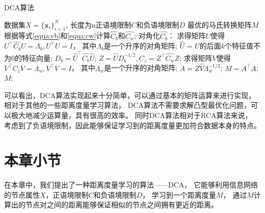 \begin{algorithm}[htb]
    \caption{DCA算法}
    \label{algo:dca}
    \begin{algorithmic}[1]
        \Require
        数据集$X = \{ \bm{x}_i \}_{i=1}^{N}$,
        长度为n正语境限制$C$和负语境限制$D$        
        \Ensure
        最优的马氏转换矩阵$M$
        \State 根据等式\ref{equa:cb}和\ref{equa:cw}计算$\hat{C_b}$和$\hat{C_w}$;
        \State 对角化$\hat{C_b}$： 
        \State 求得矩阵$U$使得$U^\top \hat{C_b} U = \Lambda_b, U^\top U = I$，
            其中$\Lambda_b$是一个升序的对角矩阵;
        \State $\hat{U}$ = $U$的后面$k$个特征值不为$0$的特征向量;
        \State $D_b = \hat{U}^\top\hat{C_b}\hat{U}$;
        \State $Z = \hat{U}D_b^{-1/2}, C_z = Z^\top\hat{C_w}Z$;
        \State 求得矩阵$V$使得$V^\top C_z V = \Lambda_w, V^\top V = I$，
                其中$\Lambda_w$是一个升序的对角矩阵;
        \State $A = Z\hat{V}\Lambda_w^{-1/2}$; 
        \State $M = A^\top A$; 
        \Return $M$;
    \end{algorithmic}
\end{algorithm}

可以看出，DCA算法实现起来十分简单，可以通过基本的矩阵运算来进行实现，
相对于其他的一些距离度量学习算法，
DCA算法不需要求解凸型最优化问题，可以极大地减少运算量，具有很高的效率。
同时DCA算法相对于RCA算法来说，
考虑到了负语境限制，因此能够保证学习到的距离度量更加符合数据本身的特点。


\section{本章小节}

在本章中，我们提出了一种距离度量学习的算法——DCA，
它能够利用信息网络的节点属性$X$，正语境限制$C$和负语境限制$D$，
学习到一个距离度量$M$，
通过$M$计算出的节点对之间的距离能够保证相似的节点之间拥有更近的距离。
